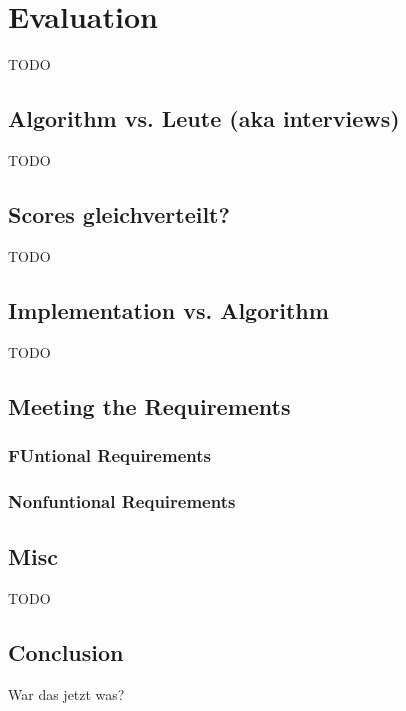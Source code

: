 \chapter{Evaluation}
TODO

\section{Algorithm vs. Leute (aka interviews)}
TODO

\section{Scores gleichverteilt?}
TODO

\section{Implementation vs. Algorithm}
TODO

\section{Meeting the Requirements}
\subsection{FUntional Requirements}
\subsection{Nonfuntional Requirements}



\section{Misc}
TODO

\section{Conclusion}
War das jetzt was?

